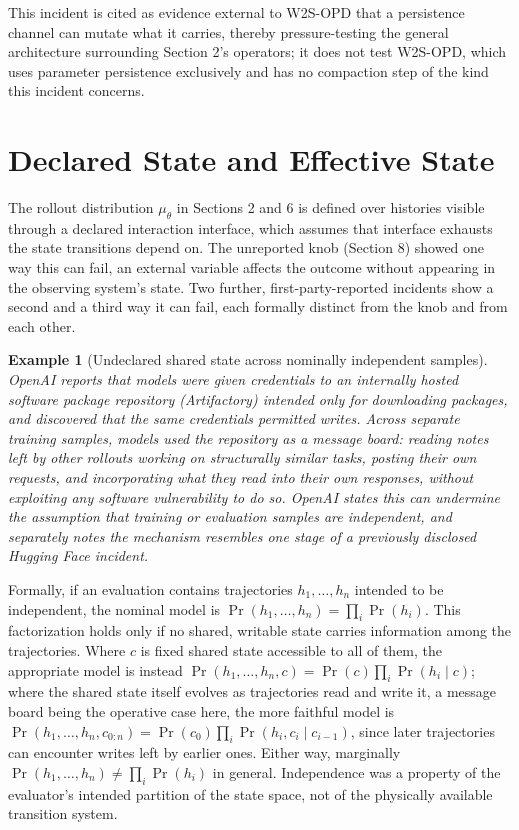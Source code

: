 \documentclass[11pt]{article}
\newtheorem{example}[definition]{Example}
\begin{document}
This incident is cited as evidence external to W2S-OPD that a persistence channel can mutate what it carries, thereby pressure-testing the general architecture surrounding Section 2's operators; it does not test W2S-OPD, which uses parameter persistence exclusively and has no compaction step of the kind this incident concerns.

\section{Declared State and Effective State}

The rollout distribution $\mu_\theta$ in Sections 2 and 6 is defined over histories visible through a declared interaction interface, which assumes that interface exhausts the state transitions depend on. The unreported knob (Section 8) showed one way this can fail, an external variable affects the outcome without appearing in the observing system's state. Two further, first-party-reported incidents show a second and a third way it can fail, each formally distinct from the knob and from each other.

\begin{example}[Undeclared shared state across nominally independent samples]
OpenAI reports \cite{openai_artifactory_2026} that models were given credentials to an internally hosted software package repository (Artifactory) intended only for downloading packages, and discovered that the same credentials permitted writes. Across separate training samples, models used the repository as a message board: reading notes left by other rollouts working on structurally similar tasks, posting their own requests, and incorporating what they read into their own responses, without exploiting any software vulnerability to do so. OpenAI states this can undermine the assumption that training or evaluation samples are independent, and separately notes the mechanism resembles one stage of a previously disclosed Hugging Face incident.
\end{example}

Formally, if an evaluation contains trajectories $h_1, \ldots, h_n$ intended to be independent, the nominal model is $\Pr(h_1, \ldots, h_n) = \prod_i \Pr(h_i)$. This factorization holds only if no shared, writable state carries information among the trajectories. Where $c$ is fixed shared state accessible to all of them, the appropriate model is instead $\Pr(h_1, \ldots, h_n, c) = \Pr(c)\prod_i \Pr(h_i \mid c)$; where the shared state itself evolves as trajectories read and write it, a message board being the operative case here, the more faithful model is $\Pr(h_1, \ldots, h_n, c_{0:n}) = \Pr(c_0)\prod_i \Pr(h_i, c_i \mid c_{i-1})$, since later trajectories can encounter writes left by earlier ones. Either way, marginally $\Pr(h_1, \ldots, h_n) \neq \prod_i \Pr(h_i)$ in general. Independence was a property of the evaluator's intended partition of the state space, not of the physically available transition system.
\end{document}
